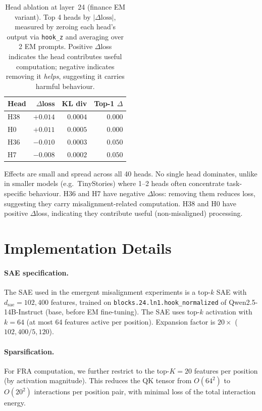 \documentclass{article}
\theoremstyle{plain}
\theoremstyle{definition}
\theoremstyle{remark}
\newcommand{\dsae}{d_{\mathrm{sae}}}
\begin{document}
\begin{table}[h]
\caption{Head ablation at layer~24 (finance EM variant). Top 4 heads by $|\Delta\text{loss}|$, measured by zeroing each head's output via \texttt{hook\_z} and averaging over 2 EM prompts. Positive $\Delta$loss indicates the head contributes useful computation; negative indicates removing it \emph{helps}, suggesting it carries harmful behaviour.}
\label{tab:head_ablation}
\centering
\begin{tabular}{lrrr}
\toprule
Head & $\Delta$loss & KL div & Top-1 $\Delta$ \\
\midrule
H38 & $+0.014$ & $0.0004$ & $0.000$ \\
H0  & $+0.011$ & $0.0005$ & $0.000$ \\
H36 & $-0.010$ & $0.0003$ & $0.050$ \\
H7  & $-0.008$ & $0.0002$ & $0.050$ \\
\bottomrule
\end{tabular}
\end{table}

Effects are small and spread across all 40 heads. No single head dominates, unlike in smaller models (e.g.\ TinyStories) where 1--2 heads often concentrate task-specific behaviour. H36 and H7 have negative $\Delta$loss: removing them reduces loss, suggesting they carry misalignment-related computation. H38 and H0 have positive $\Delta$loss, indicating they contribute useful (non-misaligned) processing.


\section{Implementation Details}
\label{app:implementation}

\paragraph{SAE specification.} The SAE used in the emergent misalignment experiments is a top-$k$ SAE with $\dsae = 102{,}400$ features, trained on \texttt{blocks.24.ln1.hook\_normalized} of Qwen2.5-14B-Instruct (base, before EM fine-tuning). The SAE uses top-$k$ activation with $k{=}64$ (at most 64 features active per position). Expansion factor is $20\times$ ($102{,}400 / 5{,}120$).

\paragraph{Sparsification.} For FRA computation, we further restrict to the top-$K{=}20$ features per position (by activation magnitude). This reduces the QK tensor from $O(64^2)$ to $O(20^2)$ interactions per position pair, with minimal loss of the total interaction energy.
\end{document}
